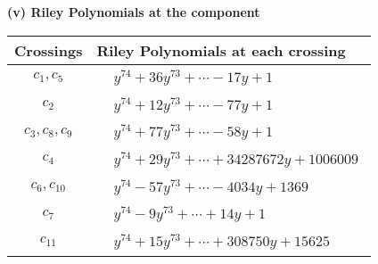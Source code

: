 \documentclass[1p]{elsarticle_modified}
\theoremstyle{definition}
\begin{document}
\flushleft \textbf{(v) Riley Polynomials at the component}\newline \\
\begin{tabular}{m{50pt}|m{274pt}}
Crossings & \hspace{64pt}Riley Polynomials at each crossing \\
\hline $$\begin{aligned}c_{1},c_{5}\end{aligned}$$&$\begin{aligned}
&y^{74}+36 y^{73}+\cdots-17 y+1
\end{aligned}$\\
\hline $$\begin{aligned}c_{2}\end{aligned}$$&$\begin{aligned}
&y^{74}+12 y^{73}+\cdots-77 y+1
\end{aligned}$\\
\hline $$\begin{aligned}c_{3},c_{8},c_{9}\end{aligned}$$&$\begin{aligned}
&y^{74}+77 y^{73}+\cdots-58 y+1
\end{aligned}$\\
\hline $$\begin{aligned}c_{4}\end{aligned}$$&$\begin{aligned}
&y^{74}+29 y^{73}+\cdots+34287672 y+1006009
\end{aligned}$\\
\hline $$\begin{aligned}c_{6},c_{10}\end{aligned}$$&$\begin{aligned}
&y^{74}-57 y^{73}+\cdots-4034 y+1369
\end{aligned}$\\
\hline $$\begin{aligned}c_{7}\end{aligned}$$&$\begin{aligned}
&y^{74}-9 y^{73}+\cdots+14 y+1
\end{aligned}$\\
\hline $$\begin{aligned}c_{11}\end{aligned}$$&$\begin{aligned}
&y^{74}+15 y^{73}+\cdots+308750 y+15625
\end{aligned}$\\
\hline
\end{tabular}\\~\\
\end{document}
